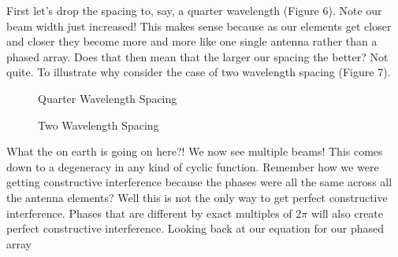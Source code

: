 \documentclass[12pt,a6paper]{book}
\begin{document}
First let's drop the spacing to, say, a quarter wavelength (Figure 6). Note our beam width just increased! This makes sense because as our elements get closer and closer they become more and more like one single antenna rather than a phased array. Does that then mean that the larger our spacing the better? Not quite. To illustrate why consider the case of two wavelength spacing (Figure 7). 

\begin{figure}[!htb]
\caption{\label{fig:my-label} Quarter Wavelength Spacing}
\end{figure}

\begin{figure}[!htb]
\caption{\label{fig:my-label} Two Wavelength Spacing}
\end{figure}

What the on earth is going on here?! We now see multiple beams! This comes down to a degeneracy in any kind of cyclic function. Remember how we were getting constructive interference because the phases were all the same across all the antenna elements? Well this is not the only way to get perfect constructive interference. Phases that are different by exact multiples of $2\pi$ will also create perfect constructive interference. Looking back at our equation for our phased array
\end{document}
